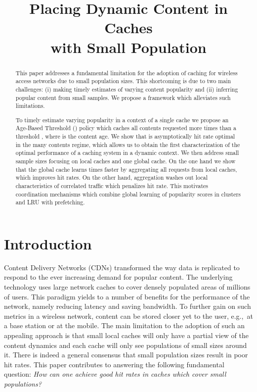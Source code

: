 \documentclass[10pt, conference, letterpaper]{IEEEtran}
\title{Placing Dynamic Content in Caches \\with Small Population}
\author{
\IEEEauthorblockN{Mathieu Leconte, Georgios Paschos, Lazaros Gkatzikis, Moez Draief, Spyridon Vassilaras, Symeon Chouvardas}
\IEEEauthorblockA{Mathematical and Algorithmic Sciences Lab, France Research Center, Huawei Technologies Co., Ltd.\\
Email: firstname.lastname@huawei.com}
}
\begin{document}
\maketitle
\begin{abstract}
This paper addresses a fundamental limitation for the adoption of caching for wireless access networks due to small population sizes. This shortcoming is due to two main challenges: (i) making timely estimates of varying content popularity and (ii) inferring popular content from small samples. We propose a framework which alleviates such limitations. 

To timely estimate varying popularity in a context of a single cache we propose an Age-Based Threshold () policy which caches all contents requested more times than a threshold , where  is the content age.
We show that  is asymptotically hit rate optimal in the many contents regime, which allows us to obtain the first characterization of the optimal performance of a caching system in a dynamic context. 
We then address small sample sizes focusing on  local caches and one global cache. On the one hand we show that the global cache learns  times faster by aggregating all requests from local caches, which improves hit rates. On the other hand, aggregation washes out local characteristics of correlated traffic which penalizes hit rate.
This motivates coordination mechanisms which combine global learning of popularity scores in clusters and LRU with prefetching.  
\end{abstract}
\vspace{-0.2in}
\section{Introduction}
Content Delivery Networks (CDNs) transformed the way data is replicated to respond to the ever increasing demand for popular content. The underlying technology uses large network caches to cover densely populated areas of millions of users. This paradigm yields to a number of benefits for the performance of the network, namely reducing latency and saving bandwidth. To further gain on such metrics in a wireless network, content can be stored closer yet to the user, e.g.,~at a base station or at the mobile. The main limitation to the adoption of such an appealing approach is that small local caches will only have a partial view of the content dynamics and each cache will only see populations of small sizes around it. There is indeed a general consensus that small population sizes result in poor hit rates. 
This paper contributes to answering the following fundamental question: \emph{How can one achieve good hit rates in caches which cover small populations?}
\end{document}
